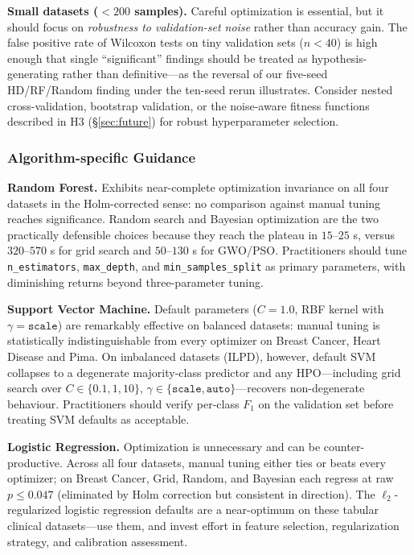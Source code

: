 \documentclass[letterpaper, 10 pt, conference]{ieeeconf}
\begin{document}
\textbf{Small datasets ($<200$ samples).} Careful optimization is essential, but it should focus on \emph{robustness to validation-set noise} rather than accuracy gain. The false positive rate of Wilcoxon tests on tiny validation sets ($n < 40$) is high enough that single ``significant'' findings should be treated as hypothesis-generating rather than definitive---as the reversal of our five-seed HD/RF/Random finding under the ten-seed rerun illustrates. Consider nested cross-validation, bootstrap validation, or the noise-aware fitness functions described in H3 (\S\ref{sec:future}) for robust hyperparameter selection.

\subsubsection{Algorithm-specific Guidance}

\textbf{Random Forest.} Exhibits near-complete optimization invariance on all four datasets in the Holm-corrected sense: no comparison against manual tuning reaches significance. Random search and Bayesian optimization are the two practically defensible choices because they reach the plateau in $15$--$25$ s, versus $320$--$570$ s for grid search and $50$--$130$ s for GWO/PSO. Practitioners should tune \texttt{n\_estimators}, \texttt{max\_depth}, and \texttt{min\_samples\_split} as primary parameters, with diminishing returns beyond three-parameter tuning.

\textbf{Support Vector Machine.} Default parameters ($C = 1.0$, RBF kernel with $\gamma = \texttt{scale}$) are remarkably effective on balanced datasets: manual tuning is statistically indistinguishable from every optimizer on Breast Cancer, Heart Disease and Pima. On imbalanced datasets (ILPD), however, default SVM collapses to a degenerate majority-class predictor and any HPO---including grid search over $C \in \{0.1, 1, 10\}$, $\gamma \in \{\texttt{scale}, \texttt{auto}\}$---recovers non-degenerate behaviour. Practitioners should verify per-class $F_1$ on the validation set before treating SVM defaults as acceptable.

\textbf{Logistic Regression.} Optimization is unnecessary and can be counter-productive. Across all four datasets, manual tuning either ties or beats every optimizer; on Breast Cancer, Grid, Random, and Bayesian each regress at raw $p \le 0.047$ (eliminated by Holm correction but consistent in direction). The $\ell_2$-regularized logistic regression defaults are a near-optimum on these tabular clinical datasets---use them, and invest effort in feature selection, regularization strategy, and calibration assessment.
\end{document}

